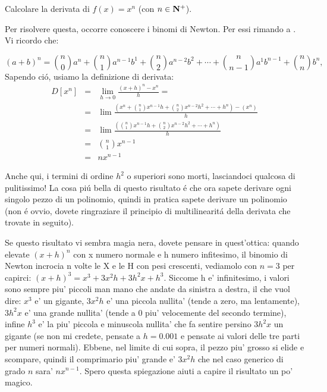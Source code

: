 \begin{esercizio}
Calcolare la derivata di $f(x)=x^n$ (con $n \in \mathbf{N}^+$).

Per risolvere questa, occorre conoscere i binomi di Newton. Per essi rimando a . Vi ricordo che:

\begin{equation}
(a+b)^n=\binom{n}{0}a^n+\binom{n}{1}a^{n-1}b^1+\binom{n}{2}a^{n-2}b^2+\cdots+\binom{n}{n-1}a^1b^{n-1}+\binom{n}{n}b^n,
\end{equation}
Sapendo ci\'o, usiamo la definizione di derivata:
\begin{eqnarray}
D[x^n]  & = & \lim_{h \rightarrow 0}\frac{(x+h)^n-x^n}{h} = \\
	& = & \lim \frac{(x^n+\binom{n}{1}x^{n-1}h+\binom{n}{2}x^{n-2}h^2+\cdots+h^n) - (x^n) }{h} \\
	& = & \lim \frac{(\binom{n}{1}x^{n-1}h+\binom{n}{2}x^{n-2}h^2+\cdots+h^n)}{h} \\
	& = & \binom{n}{1}x^{n-1} \\
	& = & nx^{n-1}
\end{eqnarray}

Anche qui, i termini di ordine $h^2$ o superiori sono morti, lasciandoci qualcosa di pulitissimo! La cosa pi\'u bella di questo
risultato \'e che ora sapete derivare ogni singolo pezzo di un polinomio, quindi in pratica sapete derivare un polinomio (non \'e
ovvio, dovete ringraziare il principio di multilinearit\'a della derivata che trovate in seguito).

Se questo risultato vi sembra magia nera, dovete pensare in quest'ottica: quando elevate $(x+h)^n$ con x numero normale e h numero 
infitesimo, il binomio di Newton incrocia n volte le X e le H con pesi crescenti, vediamolo con $n=3$ per capirci: 
$ (x+h)^3 = x^3 + 3 x^2h + 3 h^2x + h^3 $. Siccome h e' infinitesimo, i valori sono sempre piu' piccoli man mano che andate da sinistra
a destra, il che vuol dire: $x^3$ e' un gigante, $3 x^2h $ e' una piccola nullita' (tende a zero, ma lentamente), $3 h^2x $ e' una grande
nullita' (tende a 0 piu' velocemente del secondo termine), infine $ h^3 $ e' la piu' piccola e minuscola nullita' che fa sentire persino 
$3 h^2x $ un gigante (se non mi credete, pensate a $h=0.001$ e pensate ai valori delle tre parti per numeri normali).
Ebbene, nel limite di cui sopra, il pezzo piu' grosso si elide e scompare, quindi il comprimario piu' grande e' $ 3 x^2h $ che nel caso 
generico di grado $n$ sara' $nx^{n-1}$. Spero questa spiegazione aiuti a capire il risultato un po' magico.
\end{esercizio}

